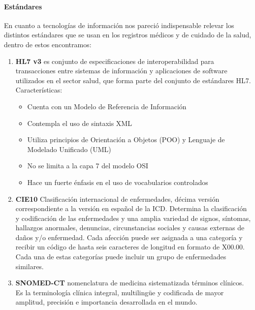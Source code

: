 {\correccionTexto
\paragraph{Estándares}


En cuanto a tecnologías de información nos pareció indispensable relevar los distintos estándares que se usan en los registros médicos y de cuidado de la salud, dentro de estos encontramos:

\begin{enumerate}
	\item\textbf{HL7 v3} es conjunto de especificaciones de interoperabilidad para transacciones entre sistemas de información y aplicaciones de software utilizados en el sector salud, que forma parte del conjunto de estándares HL7. Características:
    	\begin{itemize}
			\item Cuenta con un Modelo de Referencia de Información
            \item Contempla el uso de sintaxis XML
            \item Utiliza principios de Orientación a Objetos (POO) y Lenguaje de Modelado Unificado (UML)
            \item No se limita a la capa 7 del modelo OSI
            \item Hace un fuerte énfasis en el uso de vocabularios controlados
		\end{itemize}
    
    \item\textbf{CIE10}  Clasificación internacional de enfermedades, décima versión correspondiente a la versión en español de la ICD. Determina la clasificación y codificación de las enfermedades y una amplia variedad de signos, síntomas, hallazgos anormales, denuncias, circunstancias sociales y causas externas de daños y/o enfermedad. Cada afección puede ser asignada a una categoría y recibir un código de hasta seis caracteres de longitud en formato de X00.00. Cada una de estas categorías puede incluir un grupo de enfermedades similares.
    
    \item\textbf{SNOMED-CT} nomenclatura de medicina sistematizada \- términos clínicos. Es la terminología clínica integral, multiling\"{u}e y codificada de mayor amplitud, precisión e importancia desarrollada en el mundo.
    

\end{enumerate}}
